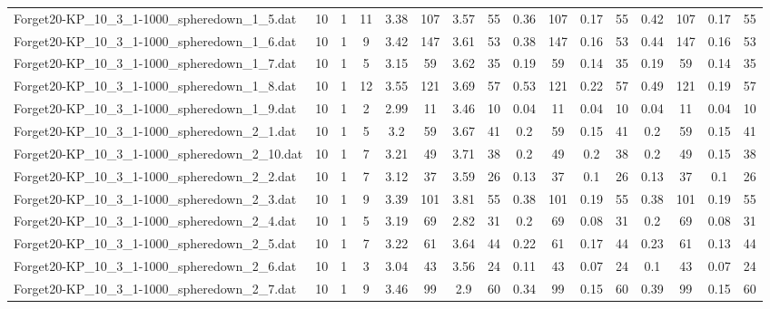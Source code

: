 \begin{sidewaystable}[!ht]
{\begin{tabular}{lccccccccccccccc}
Forget20-KP\_10\_3\_1-1000\_spheredown\_1\_5.dat & 10 & 1 & 11 & 3.38 & 107 & 3.57 & 55 & 0.36 & 107 &  \textcolor{blue2}{0.17} & 55 & 0.42 & 107 &  \textcolor{blue2}{0.17} & 55 \\
Forget20-KP\_10\_3\_1-1000\_spheredown\_1\_6.dat & 10 & 1 & 9 & 3.42 & 147 & 3.61 & 53 & 0.38 & 147 &  \textcolor{blue2}{0.16} & 53 & 0.44 & 147 &  \textcolor{blue2}{0.16} & 53 \\
Forget20-KP\_10\_3\_1-1000\_spheredown\_1\_7.dat & 10 & 1 & 5 & 3.15 & 59 & 3.62 & 35 & 0.19 & 59 &  \textcolor{blue2}{0.14} & 35 & 0.19 & 59 &  \textcolor{blue2}{0.14} & 35 \\
Forget20-KP\_10\_3\_1-1000\_spheredown\_1\_8.dat & 10 & 1 & 12 & 3.55 & 121 & 3.69 & 57 & 0.53 & 121 & 0.22 & 57 & 0.49 & 121 &  \textcolor{blue2}{0.19} & 57 \\
Forget20-KP\_10\_3\_1-1000\_spheredown\_1\_9.dat & 10 & 1 & 2 & 2.99 & 11 & 3.46 & 10 &  \textcolor{blue2}{0.04} & 11 &  \textcolor{blue2}{0.04} & 10 &  \textcolor{blue2}{0.04} & 11 &  \textcolor{blue2}{0.04} & 10 \\
Forget20-KP\_10\_3\_1-1000\_spheredown\_2\_1.dat & 10 & 1 & 5 & 3.2 & 59 & 3.67 & 41 & 0.2 & 59 & 0.15 & 41 & 0.2 & 59 & 0.15 & 41 \\
Forget20-KP\_10\_3\_1-1000\_spheredown\_2\_10.dat & 10 & 1 & 7 & 3.21 & 49 & 3.71 & 38 & 0.2 & 49 & 0.2 & 38 & 0.2 & 49 &  \textcolor{blue2}{0.15} & 38 \\
Forget20-KP\_10\_3\_1-1000\_spheredown\_2\_2.dat & 10 & 1 & 7 & 3.12 & 37 & 3.59 & 26 & 0.13 & 37 &  \textcolor{blue2}{0.1} & 26 & 0.13 & 37 &  \textcolor{blue2}{0.1} & 26 \\
Forget20-KP\_10\_3\_1-1000\_spheredown\_2\_3.dat & 10 & 1 & 9 & 3.39 & 101 & 3.81 & 55 & 0.38 & 101 &  \textcolor{blue2}{0.19} & 55 & 0.38 & 101 &  \textcolor{blue2}{0.19} & 55 \\
Forget20-KP\_10\_3\_1-1000\_spheredown\_2\_4.dat & 10 & 1 & 5 & 3.19 & 69 & 2.82 & 31 & 0.2 & 69 &  \textcolor{blue2}{0.08} & 31 & 0.2 & 69 &  \textcolor{blue2}{0.08} & 31 \\
Forget20-KP\_10\_3\_1-1000\_spheredown\_2\_5.dat & 10 & 1 & 7 & 3.22 & 61 & 3.64 & 44 & 0.22 & 61 & 0.17 & 44 & 0.23 & 61 &  \textcolor{blue2}{0.13} & 44 \\
Forget20-KP\_10\_3\_1-1000\_spheredown\_2\_6.dat & 10 & 1 & 3 & 3.04 & 43 & 3.56 & 24 & 0.11 & 43 &  \textcolor{blue2}{0.07} & 24 & 0.1 & 43 &  \textcolor{blue2}{0.07} & 24 \\
Forget20-KP\_10\_3\_1-1000\_spheredown\_2\_7.dat & 10 & 1 & 9 & 3.46 & 99 & 2.9 & 60 & 0.34 & 99 &  \textcolor{blue2}{0.15} & 60 & 0.39 & 99 &  \textcolor{blue2}{0.15} & 60 \\

\end{tabular}}
\end{sidewaystable}
